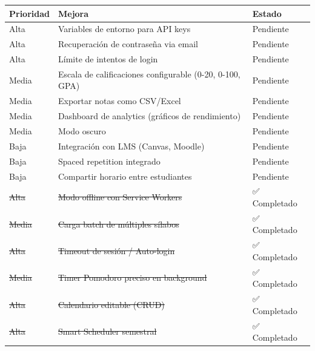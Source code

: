 \documentclass[
  spanish,
  11pt,
  a4paper,
]{article}
\newcounter{none} %
\begin{document}
{\def\LTcaptype{none} %
\begin{longtable}[]{@{}
  >{\raggedright\arraybackslash}p{}
  >{\raggedright\arraybackslash}p{}
  >{\raggedright\arraybackslash}p{}@{}}
\toprule\noalign{}
\begin{minipage}[b]{\linewidth}\raggedright
Prioridad
\end{minipage} & \begin{minipage}[b]{\linewidth}\raggedright
Mejora
\end{minipage} & \begin{minipage}[b]{\linewidth}\raggedright
Estado
\end{minipage} \\
\midrule\noalign{}
\endhead
\bottomrule\noalign{}
\endlastfoot
Alta & Variables de entorno para API keys & Pendiente \\
Alta & Recuperación de contraseña via email & Pendiente \\
Alta & Límite de intentos de login & Pendiente \\
Media & Escala de calificaciones configurable (0-20, 0-100, GPA) &
Pendiente \\
Media & Exportar notas como CSV/Excel & Pendiente \\
Media & Dashboard de analytics (gráficos de rendimiento) & Pendiente \\
Media & Modo oscuro & Pendiente \\
Baja & Integración con LMS (Canvas, Moodle) & Pendiente \\
Baja & Spaced repetition integrado & Pendiente \\
Baja & Compartir horario entre estudiantes & Pendiente \\
\st{Alta} & \st{Modo offline con Service Workers} & ✅ Completado \\
\st{Media} & \st{Carga batch de múltiples sílabos} & ✅ Completado \\
\st{Alta} & \st{Timeout de sesión / Auto-login} & ✅ Completado \\
\st{Media} & \st{Timer Pomodoro preciso en background} & ✅
Completado \\
\st{Alta} & \st{Calendario editable (CRUD)} & ✅ Completado \\
\st{Alta} & \st{Smart Scheduler semestral} & ✅ Completado \\
\end{longtable}
}
\end{document}
